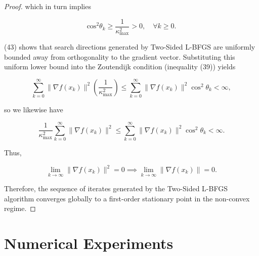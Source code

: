 \documentclass[twoside,11pt]{article}
\begin{document}
\begin{proof}
\noindent
which in turn implies

\begin{equation}
\text{cos}^2\theta_k \geq \frac{1}{\kappa^2_{\text{max}}} > 0, \quad \forall k \geq 0.
\end{equation}

\noindent
(43) shows that search directions generated by Two-Sided L-BFGS are uniformly bounded away from orthogonality to the gradient vector. Substituting this uniform lower bound into the Zoutendijk condition (inequality (39)) yields

\begin{equation}
\sum_{k=0}^{\infty} \|\nabla f(x_k)\|^2 \left(\frac{1}{\kappa_{\max}^2}\right) \leq \sum_{k=0}^{\infty} \|\nabla f(x_k)\|^2 \cos^2\theta_k < \infty,
\end{equation}

\noindent
so we likewise have

\begin{equation}
\frac{1}{\kappa_{\max}^2} \sum_{k=0}^{\infty} \|\nabla f(x_k)\|^2 \leq \sum_{k=0}^{\infty} \|\nabla f(x_k)\|^2 \cos^2\theta_k < \infty.
\end{equation}

\noindent
Thus,

\begin{equation}
\lim_{k \to \infty} \|\nabla f(x_k)\|^2 = 0 \implies \lim_{k \to \infty} \|\nabla f(x_k)\| = 0.
\end{equation}

\noindent
Therefore, the sequence of iterates generated by the Two-Sided L-BFGS algorithm converges globally to a first-order stationary point in the non-convex regime.
\end{proof}

\section{Numerical Experiments}
\end{document}
